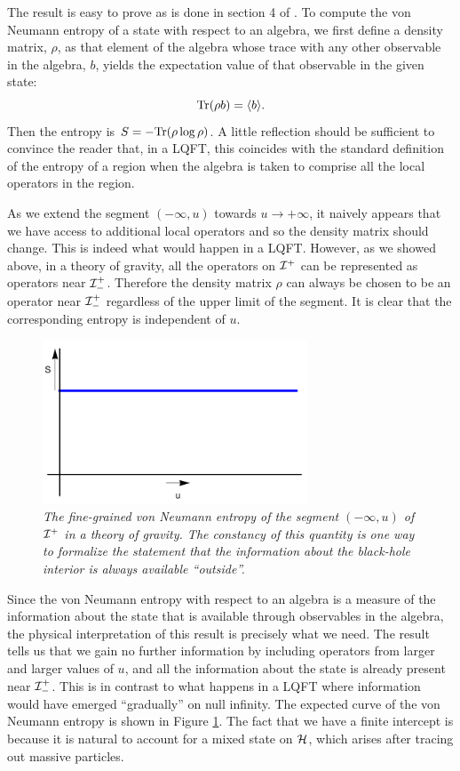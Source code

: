 \documentclass[12pt]{article}
\def\tr{{\rm Tr}}
\newcommand{\be}{\begin{equation}}
\newcommand{\ee}{\end{equation}}
\def \scrip{{\cal I}^{+}}
\def \scrippast{{\cal I}^{+}_{-}}
\begin{document}
The result is easy to prove as is done in section 4 of \cite{Laddha:2020kvp}. To compute the von Neumann entropy of a state with respect to an algebra, we first define a density matrix, $\rho$,  as that element of the algebra whose trace with any other observable in the algebra, $b$, yields the expectation value of that observable in the given state:
\be
\tr(\rho b) = \langle b \rangle.
\ee
Then the entropy is $S = -\tr(\rho \log \rho)$. A little reflection should be sufficient to convince the reader that, in a LQFT, this coincides with the standard definition of the entropy of a region when the algebra is taken to comprise all the local operators in the region.


 As we extend the segment $(-\infty, u)$ towards $u \rightarrow +\infty$,   it naively appears that we have access to additional local operators and so the density matrix should change.  This is indeed what would happen in a LQFT. However, as we showed above, in  a theory of gravity, all the operators on $\scrip$ can be represented as operators near $\scrippast$. Therefore the density matrix $\rho$ can always be chosen to be an operator near $\scrippast$ regardless of the upper limit of the segment. It is clear that the corresponding entropy is independent of $u$.

\begin{figure}[!ht]
\begin{center}
\includegraphics[width=0.7\textwidth]{truepage.pdf}
\caption{\em The fine-grained von Neumann entropy of the segment $(-\infty, u)$ of $\scrip$ in a theory of gravity. The constancy of this quantity is one way to formalize the  statement that the information about the black-hole interior is always available ``outside''. \label{figvn}}
\end{center}
\end{figure}

Since the von Neumann entropy with respect to an algebra is a measure of the information about the state that is available through observables in the algebra, the physical interpretation of this result is precisely what we need.  The result tells us that we gain no further information by including operators from larger and larger values of $u$, and all the information about the state is already present near $\scrippast$. This is in contrast to what happens in a LQFT where information would have emerged ``gradually'' on null infinity.  The expected curve of the von Neumann entropy is shown in Figure \ref{figvn}. The fact that we have a finite intercept is because it is natural to account for a mixed state on  ${\cal H}$, which arises after tracing out massive particles.
\end{document}
